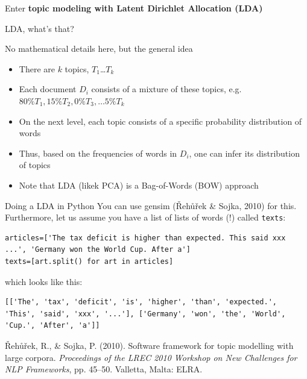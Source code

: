 \documentclass[handout]{beamer}
\begin{document}
\begin{frame}{}
	Enter \textbf{topic modeling with Latent Dirichlet Allocation (LDA)}
\end{frame}






\begin{frame}{LDA, what's that?}
	\begin{block}{No mathematical details here, but the general idea}
		\begin{itemize}
			\item There are $k$ topics, $T_1$\ldots$T_k$
			\item Each document $D_i$ consists of a mixture of these topics, e.g.$80\% T_1, 15\% T_2, 0\% T_3, \ldots 5\% T_k $
			\item On the next level, each topic consists of a specific probability distribution of words
			\item Thus, based on the frequencies of words in $D_i$, one can infer its distribution of topics
			\item Note that LDA (likek PCA) is a Bag-of-Words (BOW) approach
		\end{itemize}
	\end{block}
	
\end{frame}




\begin{frame}[fragile]{Doing a LDA in Python}
	You can use gensim ({\v R}eh{\r u}{\v r}ek \& Sojka, 2010) for this.
%	
	Furthermore, let us assume you have a list of lists of words (!) called \texttt{texts}:
	
\begin{lstlisting}
articles=['The tax deficit is higher than expected. This said xxx ...', 'Germany won the World Cup. After a']
texts=[art.split() for art in articles]
\end{lstlisting}
which looks like this:
\begin{lstlisting}
[['The', 'tax', 'deficit', 'is', 'higher', 'than', 'expected.', 'This', 'said', 'xxx', '...'], ['Germany', 'won', 'the', 'World', 'Cup.', 'After', 'a']]
\end{lstlisting}

\tiny{{\v R}eh{\r u}{\v r}ek, R., \& Sojka, P. (2010). Software framework for topic modelling with large corpora. \emph{Proceedings of the LREC 2010 Workshop on New Challenges for NLP Frameworks}, pp. 45–50. Valletta, Malta: ELRA. }

\end{frame}
\end{document}
